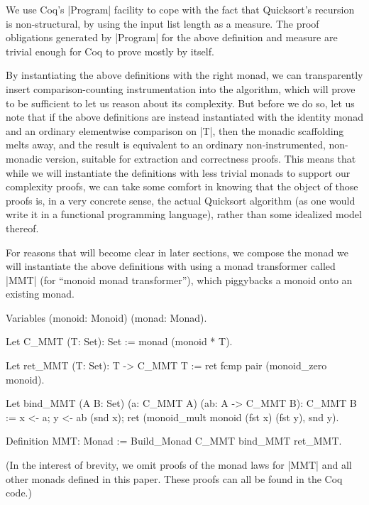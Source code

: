 \documentclass[runningheads]{llncs}
\begin{document}
We use Coq's |Program| facility \cite{subsetcoercions} to cope with the fact that Quicksort's recursion is non-structural, by using the input list length as a measure. The proof obligations generated by |Program| for the above definition and measure are trivial enough for Coq to prove mostly by itself.

By instantiating the above definitions with the right monad, we can transparently insert comparison-counting instrumentation into the algorithm, which will prove to be sufficient to let us reason about its complexity. But before we do so, let us note that if the above definitions are instead instantiated with the identity monad and an ordinary elementwise comparison on |T|, then the monadic scaffolding melts away, and the result is equivalent to an ordinary non-instrumented, non-monadic version, suitable for extraction and correctness proofs. This means that while we will instantiate the definitions with less trivial monads to support our complexity proofs, we can take some comfort in knowing that the object of those proofs is, in a very concrete sense, the actual Quicksort algorithm (as one would write it in a functional programming language), rather than some idealized model thereof.

For reasons that will become clear in later sections, we compose the monad we will instantiate the above definitions with using a monad transformer called |MMT| (for ``monoid monad transformer''), which piggybacks a monoid onto an existing monad.

\begin{code}
  Variables (monoid: Monoid) (monad: Monad).

  Let C_MMT (T: Set): Set := monad (monoid * T).

  Let ret_MMT (T: Set): T -> C_MMT T := ret fcmp pair (monoid_zero monoid).

  Let bind_MMT (A B: Set) (a: C_MMT A) (ab: A -> C_MMT B): C_MMT B :=
    x <- a; y <- ab (snd x); ret (monoid_mult monoid (fst x) (fst y), snd y).

  Definition MMT: Monad := Build_Monad C_MMT bind_MMT ret_MMT.
\end{code}
(In the interest of brevity, we omit proofs of the monad laws for |MMT| and all other monads defined in this paper. These proofs can all be found in the Coq code.)
\end{document}
